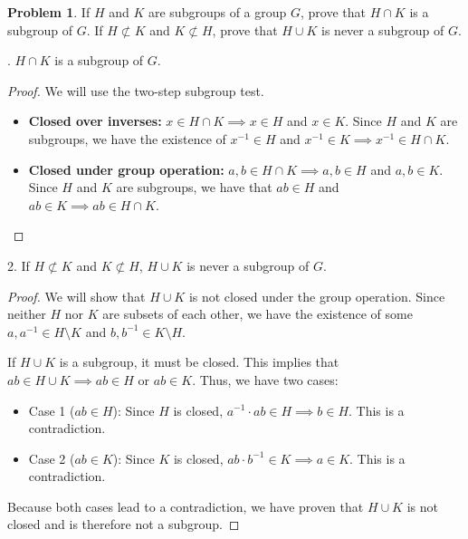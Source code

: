\documentclass[12pt,reqno]{article}
\theoremstyle{plain}
\theoremstyle{definition}
\newtheorem{problem}{Problem}
\begin{document}
\begin{problem}
    If $H$ and $K$ are subgroups of a group $G$, prove that $H \cap K$ is a subgroup of $G$. If $H \not \subset K$ and $K \not \subset H$, prove that $H \cup K$ is never a subgroup of $G$.
\end{problem}

. \(H\cap K\) is a subgroup of \(G\).

\begin{proof}
    We will use the two-step subgroup test.
    \begin{itemize}
        \item \textbf{Closed over inverses:} \(x\in H\cap K \implies x\in H\) and
        \(x\in K\). Since \(H\) and \(K\) are subgroups, we have the existence of \(x^{-1}\in H\) and 
        \(x^{-1}\in K \implies x^{-1}\in H\cap K\). 

        \item \textbf{Closed under group operation:} \(a,b\in H\cap K\implies a,b\in H\) and \(a,b\in K\).
        Since \(H\) and \(K\) are subgroups, we have that \(ab\in H\) and \(ab\in K\implies ab\in H\cap K\).
    \end{itemize}
\end{proof}

2. If $H \not \subset K$ and $K \not \subset H$, $H \cup K$ is never a subgroup of $G$.
\begin{proof}
    We will show that \(H\cup K\) is not closed under the group operation. 
    Since neither \(H\) nor \(K\) are subsets of each other, we have the existence of some 
    \(a,a^{-1}\in H\setminus K\) and \(b,b^{-1}\in K\setminus H\).

    If \(H\cup K\) is a subgroup, it must be closed. This implies that 
    \(ab\in H\cup K \implies ab\in H\) or \(ab\in K\). Thus, we have two cases:

    \begin{itemize}
        \item Case 1 (\(ab\in H\)): Since \(H\) is closed, \(a^{-1}\cdot ab \in H\implies b\in H\). This is a contradiction.

        \item Case 2 (\(ab\in K\)): Since \(K\) is closed, \(ab\cdot b^{-1}\in K\implies a\in K\). This is a contradiction.
    \end{itemize}

    Because both cases lead to a contradiction, we have proven that \(H\cup K\) is not closed
    and is therefore not a subgroup.
\end{proof}
\end{document}
